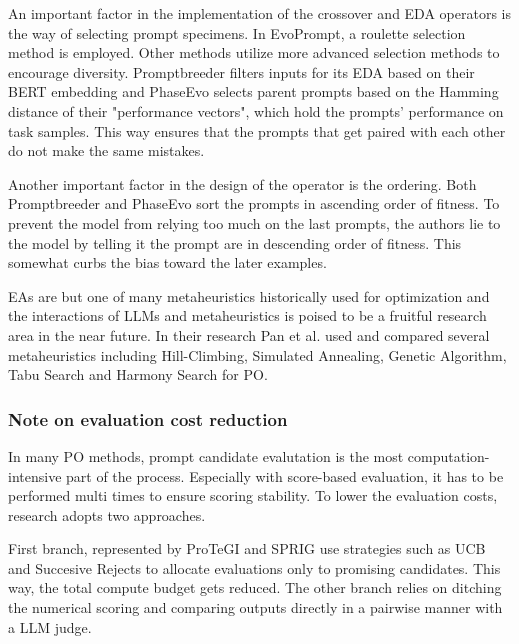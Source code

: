 An important factor in the implementation of the crossover and EDA operators is the way of selecting prompt specimens.
In EvoPrompt\cite{guo2024connectinglargelanguagemodels}, a roulette selection method is employed. Other methods utilize more advanced
selection methods to encourage diversity. Promptbreeder\cite{fernando2023promptbreederselfreferentialselfimprovementprompt} filters inputs
for its EDA based on their BERT embedding and PhaseEvo\cite{cui2024phaseevounifiedincontextprompt} selects parent prompts
based on the Hamming distance of their "performance vectors", which hold the prompts' performance on task samples.  
This way ensures that the prompts that get paired with each other do not make the same mistakes.

Another important factor in the design of the operator is the ordering. Both Promptbreeder and PhaseEvo sort 
the prompts in ascending order of fitness. To prevent the model from relying too much on the last prompts, the authors
lie to the model by telling it the prompt are in descending order of fitness. 
This somewhat curbs the bias toward the later examples\cite{cui2024phaseevounifiedincontextprompt}.

EAs are but one of many metaheuristics historically used for optimization and the 
interactions of LLMs and metaheuristics is poised to be a fruitful research area in the near future.
In their research Pan et al.\cite{pan2024plumpromptlearningusing} used and compared several metaheuristics
including Hill-Climbing, Simulated Annealing, Genetic Algorithm, Tabu Search and Harmony Search for PO.


\subsubsection{Note on evaluation cost reduction} 
In many PO methods, prompt candidate evalutation is the most computation-intensive part of the process.
Especially with score-based evaluation, it has to be performed multi times to ensure scoring stability\cite{xiang2025selfsupervisedpromptoptimization}.
To lower the evaluation costs, research adopts two approaches. 

First branch, represented by ProTeGI\cite{pryzant2023automaticpromptoptimizationgradient} and SPRIG\cite{zhang2024sprigimprovinglargelanguage} use strategies such as
UCB and Succesive Rejects to allocate evaluations only to promising candidates. This way, the total compute budget gets reduced.
The other branch relies on ditching the numerical scoring and comparing outputs directly in a pairwise manner with a LLM judge\cite{xiang2025selfsupervisedpromptoptimization}.

